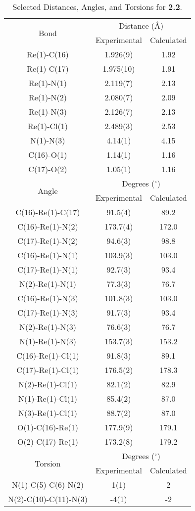 \begin{table}[htb]
  \caption{Selected Distances, Angles, and Torsions for \textbf{2.2}.}
  \centering
    \begin{tabular}{ccc}
    \toprule
    \multirow{2}{*}{Bond} & \multicolumn{2}{c}{Distance (\r{A})} \\ \cline{2-3}
     & Experimental & Calculated \\ \midrule
    Re(1)-C(16) & 1.926(9) & 1.92\\
    Re(1)-C(17) & 1.975(10) & 1.91\\
    Re(1)-N(1) & 2.119(7) & 2.13\\
    Re(1)-N(2) & 2.080(7) & 2.09\\
    Re(1)-N(3) & 2.126(7) & 2.13\\
    Re(1)-Cl(1) & 2.489(3) & 2.53 \\
    N(1)-N(3) & 4.14(1) & 4.15 \\ 
    C(16)-O(1) & 1.14(1) & 1.16 \\
    C(17)-O(2) & 1.05(1) & 1.16 \\ \midrule
    \multirow{2}{*}{Angle} & \multicolumn{2}{c}{Degrees ($^\circ$)} \\ \cline{2-3}
     & Experimental & Calculated \\ \midrule
    C(16)-Re(1)-C(17) & 91.5(4) & 89.2 \\
    C(16)-Re(1)-N(2) & 173.7(4) & 172.0 \\
    C(17)-Re(1)-N(2) & 94.6(3) & 98.8 \\
    C(16)-Re(1)-N(1) & 103.9(3) & 103.0 \\
    C(17)-Re(1)-N(1) & 92.7(3) & 93.4 \\
    N(2)-Re(1)-N(1) & 77.3(3) & 76.7 \\
    C(16)-Re(1)-N(3) & 101.8(3) & 103.0 \\
    C(17)-Re(1)-N(3) & 91.7(3) & 93.4 \\
    N(2)-Re(1)-N(3) & 76.6(3) & 76.7 \\
    N(1)-Re(1)-N(3) & 153.7(3) & 153.2 \\
    C(16)-Re(1)-Cl(1) & 91.8(3) & 89.1 \\
    C(17)-Re(1)-Cl(1) & 176.5(2) & 178.3 \\
    N(2)-Re(1)-Cl(1) & 82.1(2) & 82.9 \\
    N(1)-Re(1)-Cl(1) & 85.4(2) & 87.0 \\
    N(3)-Re(1)-Cl(1) & 88.7(2) & 87.0 \\
    O(1)-C(16)-Re(1) & 177.9(9) & 179.1 \\
    O(2)-C(17)-Re(1) & 173.2(8) & 179.2 \\ \midrule
    \multirow{2}{*}{Torsion} & \multicolumn{2}{c}{Degrees ($^\circ$)} \\ \cline{2-3}
     & Experimental & Calculated \\ \midrule
    N(1)-C(5)-C(6)-N(2) & 1(1) & 2 \\
    N(2)-C(10)-C(11)-N(3) & -4(1) & -2 \\
    \bottomrule
    \end{tabular}%
  \label{tab.da2}%
\end{table}%


